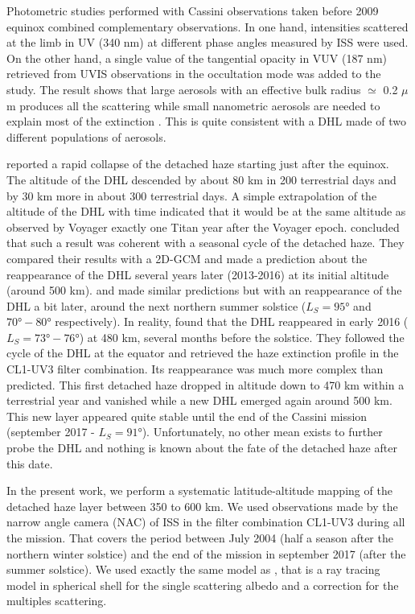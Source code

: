 Photometric studies performed with Cassini observations taken before 2009 equinox combined complementary observations.
In one hand, intensities scattered at the limb in UV (340 nm) at different phase angles measured by ISS were used. On
the other hand, a single value of the tangential opacity in VUV (187 nm) retrieved from UVIS observations in the
occultation mode \citep{Koskinen2011} was added to the study. The result shows that large aerosols with an effective bulk
radius $\simeq$ 0.2 $\mu$m produces all the scattering while small nanometric aerosols are needed to explain most of the
extinction \citep{Cours2011, Seignovert2017}. This is quite consistent with a DHL made of two different populations of
aerosols.

\cite{West2011} reported a rapid collapse of the detached haze starting just after the equinox. The altitude of
the DHL descended by about 80 km in 200 terrestrial days and by 30 km more in about 300 terrestrial days. A simple
extrapolation of the altitude of the DHL with time indicated that it would be at the same altitude as observed by Voyager
exactly one Titan year after the Voyager epoch. \cite{West2011} concluded that such a result was coherent with a seasonal
cycle of the detached haze.  They compared their results with a 2D-GCM and made a prediction about the reappearance of the
DHL several years later (2013-2016) at its initial altitude (around 500 km). \cite{Lebonnois2012} and \cite{Larson2015} made
similar predictions but with an reappearance of the DHL a bit later, around the next northern summer solstice ($L_S=\ang{95}$
and $\ang{70}-\ang{80}$ respectively). In reality, \cite{West2018} found that the DHL reappeared in early 2016
($L_S=\ang{73}-\ang{76}$) at 480 km, several months before the solstice. They followed the cycle of the DHL at the equator
and retrieved the haze extinction
profile in the CL1-UV3 filter combination. Its reappearance was much more complex than predicted. This first detached haze
dropped in altitude down to 470 km within a terrestrial year and vanished while a new DHL emerged again around 500 km. This
new layer appeared quite stable until the end of the Cassini mission (september 2017 - $L_S=\ang{91}$). Unfortunately, no other
mean exists to further probe the DHL and nothing is known about the fate of the detached haze after this date.

In the present work, we perform a systematic latitude-altitude mapping of the detached haze layer between 350 to 600 km.
We used observations made by the narrow angle camera (NAC) of ISS in the filter combination CL1-UV3 during all the
mission. That covers the period between July 2004 (half a season after the northern winter solstice) and the end of
the mission in september 2017 (after the summer solstice). We used exactly the same model as \cite{West2018}, that is
a ray tracing model in spherical shell for the single scattering albedo and a correction for the multiples scattering.

